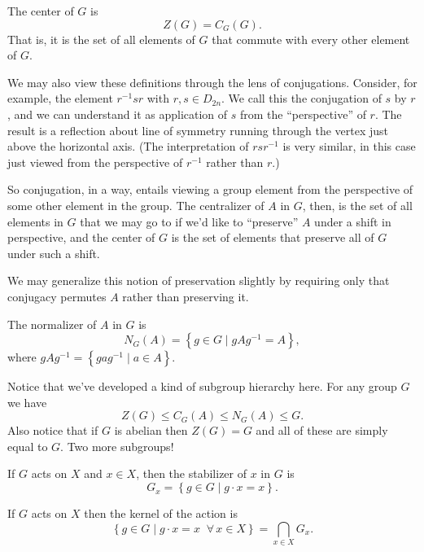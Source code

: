 \documentclass[../m171main.tex]{subfiles}
\begin{document}
\begin{definition}[Center]
    The center of $G$ is
    \[ Z(G) = C_G(G). \]
    That is, it is the set of all elements of $G$ that commute with every other element of $G$.
\end{definition}

We may also view these definitions through the lens of conjugations.
Consider, for example, the element $r^{-1} s r$ with $r,s \in D_{2n}$.
We call this the conjugation of $s$ by $r$, and we can understand it as application of $s$ from the ``perspective'' of $r$.
The result is a reflection about line of symmetry running through the vertex just above the horizontal axis.
(The interpretation of $rs r^{-1}$ is very similar, in this case just viewed from the perspective of $r^{-1}$ rather than $r$.)

So conjugation, in a way, entails viewing a group element from the perspective of some other element in the group.
The centralizer of $A$ in $G$, then, is the set of all elements in $G$ that we may go to if we'd like to ``preserve'' $A$ under a shift in perspective, and the center of $G$ is the set of elements that preserve all of $G$ under such a shift.

We may generalize this notion of preservation slightly by requiring only that conjugacy permutes $A$ rather than preserving it.

\begin{definition}[Normalizer]
    The normalizer of $A$ in $G$ is
    \[ N_G(A) = \left\{ g \in G \mid gAg^{-1} = A \right\}, \]
    where $gAg^{-1} = \left\{ gag^{-1} \mid a \in A \right\}$.
\end{definition}

Notice that we've developed a kind of subgroup hierarchy here.
For any group $G$ we have
\[ Z(G) \leq C_G(A) \leq N_G(A) \leq G. \]
Also notice that if $G$ is abelian then $Z(G) = G$ and all of these are simply equal to $G$.
Two more subgroups!

\begin{definition}[Stabilizer]
    If $G$ acts on $X$ and $x \in X$, then the stabilizer of $x$ in $G$ is
    \[ G_x = \left\{ g \in G \mid g \cdot x = x \right\}. \]
\end{definition}

\begin{definition}[Kernel]
    If $G$ acts on $X$ then the kernel of the action is
    \[ \left\{ g \in G \mid g \cdot x = x \;\;\forall\, x \in X \right\} = \bigcap_{x \in X} G_x. \]
\end{definition}
\end{document}
